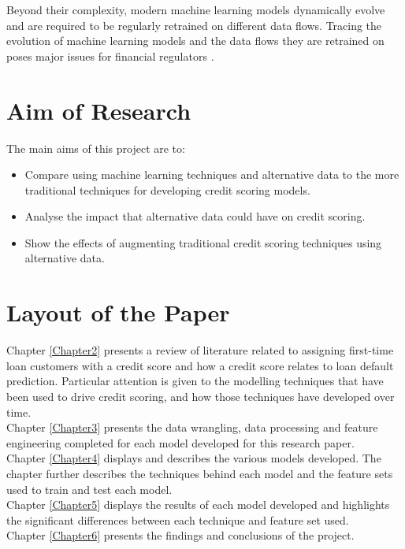 Beyond their complexity, modern machine learning models dynamically evolve and are required to be regularly retrained on different data flows. Tracing the evolution of machine learning models and the data flows they are retrained on poses major issues for financial regulators \parencite{Regulation}. \\


\section{Aim of Research}

The main aims of this project are to:

\begin{itemize}
  \item Compare using machine learning techniques and alternative data to the more traditional techniques for developing credit scoring models.
  \item Analyse the impact that alternative data could have on credit scoring.
  \item Show the effects of augmenting traditional credit scoring techniques using alternative data. 
\end{itemize}

\newpage

\section{Layout of the Paper}

Chapter \ref{Chapter2} presents a review of literature related to assigning first-time loan customers with a credit score and how a credit score relates to loan default prediction. Particular attention is given to the modelling techniques that have been used to drive credit scoring, and how those techniques have developed over time.  \\

Chapter \ref{Chapter3} presents the data wrangling, data processing and feature engineering completed for each model developed for this research paper.  \\

Chapter \ref{Chapter4} displays and describes the various models developed. The chapter further describes the techniques behind each model and the feature sets used to train and test each model. \\

Chapter \ref{Chapter5} displays the results of each model developed and highlights the significant differences between each technique and  feature set used. \\

Chapter \ref{Chapter6} presents the findings and conclusions of the project. 


